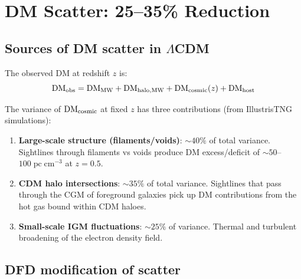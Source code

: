 \documentclass[11pt]{article}
\newcommand{\LCDM}{$\Lambda$CDM}
\newcommand{\pc}{\;\mathrm{pc\;cm}^{-3}}
\begin{document}
\section{DM Scatter: 25--35\% Reduction}
\label{sec:scatter}

\subsection{Sources of DM scatter in \LCDM}

The observed DM at redshift $z$ is:
\begin{equation}
\mathrm{DM}_{\rm obs} = \mathrm{DM}_{\rm MW} + \mathrm{DM}_{\rm halo,MW}
+ \mathrm{DM}_{\rm cosmic}(z) + \mathrm{DM}_{\rm host}
\end{equation}

The variance of $\mathrm{DM}_{\rm cosmic}$ at fixed $z$ has three
contributions (from IllustrisTNG simulations):
\begin{enumerate}
\item \textbf{Large-scale structure (filaments/voids)}: $\sim 40\%$
  of total variance.  Sightlines through filaments vs voids produce
  DM excess/deficit of $\sim 50$--$100\pc$ at $z = 0.5$.
\item \textbf{CDM halo intersections}: $\sim 35\%$ of total variance.
  Sightlines that pass through the CGM of foreground galaxies pick up
  DM contributions from the hot gas bound within CDM haloes.
\item \textbf{Small-scale IGM fluctuations}: $\sim 25\%$ of variance.
  Thermal and turbulent broadening of the electron density field.
\end{enumerate}

\subsection{DFD modification of scatter}
\end{document}
